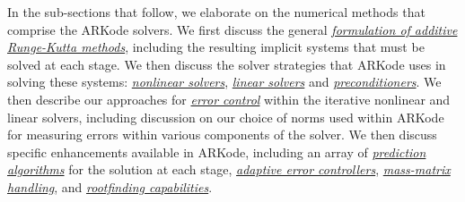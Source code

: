 \documentclass[letterpaper,10pt,english]{sphinxmanual}
\begin{document}
In the sub-sections that follow, we elaborate on the numerical
methods that comprise the ARKode solvers.  We first discuss the
general {\hyperref[Mathematics:mathematics-ark]{\emph{formulation of additive Runge-Kutta methods}}}, including the resulting implicit systems that must
be solved at each stage.  We then discuss the solver strategies that
ARKode uses in solving these systems: {\hyperref[Mathematics:mathematics-nonlinear]{\emph{nonlinear solvers}}}, {\hyperref[Mathematics:mathematics-linear]{\emph{linear solvers}}}
and {\hyperref[Mathematics:mathematics-preconditioning]{\emph{preconditioners}}}.  We then
describe our approaches for {\hyperref[Mathematics:mathematics-error]{\emph{error control}}}
within the iterative nonlinear and linear solvers, including
discussion on our choice of norms used within ARKode for measuring
errors within various components of the solver.  We then discuss
specific enhancements available in ARKode, including an array of
{\hyperref[Mathematics:mathematics-predictors]{\emph{prediction algorithms}}} for the solution
at each stage, {\hyperref[Mathematics:mathematics-adaptivity]{\emph{adaptive error controllers}}}, {\hyperref[Mathematics:mathematics-masssolve]{\emph{mass-matrix handling}}}, and {\hyperref[Mathematics:mathematics-rootfinding]{\emph{rootfinding capabilities}}}.
\end{document}
